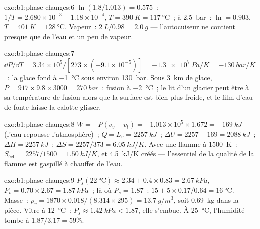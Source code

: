 \begin{solution}{exo:b1:phase-changes:6}
$\ln(1.8/1.013) = 0.575$~: $1/T = 2.680 \times 10^{-3} - 1.18 \times 10^{-4}$,
$T = \qty{390}{K} = \qty{117}{\degreeCelsius}$~; à \qty{2.5}{bar}~: $\ln = 0.903$,
$T = \qty{401}{K} = \qty{128}{\degreeCelsius}$. Vapeur~: $\qty{2}{L}/0.98 =
\qty{2.0}{g}$ --- l'autocuiseur ne contient presque que de l'eau et un peu de
vapeur.
\end{solution}

\begin{solution}{exo:b1:phase-changes:7}
$\dd P/\dd T = 3.34 \times 10^5/[273 \times (-9.1 \times 10^{-5})] = \qty{-1.3e7}{Pa/K}
= \qty{-130}{bar/K}$~: la glace fond à \qty{-1}{\degreeCelsius} sous environ
\qty{130}{bar}. Sous \qty{3}{km} de glace, $P = 917 \times 9.8 \times 3000 =
\qty{270}{bar}$~: fusion à \qty{-2}{\degreeCelsius}~; le lit d'un glacier peut
être à sa température de fusion alors que la surface est bien plus froide, et
le film d'eau de fonte laisse la calotte glisser.
\end{solution}

\begin{solution}{exo:b1:phase-changes:8}
$W = -P(v_v - v_l) = -1.013 \times 10^5 \times 1.672 = \qty{-169}{kJ}$ (l'eau
repousse l'atmosphère)~; $Q = L_v = \qty{2257}{kJ}$~; $\Delta U = 2257 - 169
= \qty{2088}{kJ}$~; $\Delta H = \qty{2257}{kJ}$~; $\Delta S = 2257/373 = \qty{6.05}{kJ/K}$.
Avec une flamme à \qty{1500}{K}~: $S_{\text{éch}} = 2257/1500 = \qty{1.50}{kJ/K}$,
et \qty{4.5}{kJ/K} créés --- l'essentiel de la qualité de la flamme est gaspillé
à chauffer de l'eau.
\end{solution}

\begin{solution}{exo:b1:phase-changes:9}
$P_s(\qty{22}{\degreeCelsius}) \approx 2.34 + 0.4 \times 0.83 = \qty{2.67}{kPa}$,
$P_v = 0.70 \times 2.67 = \qty{1.87}{kPa}$~;  là où $P_s = 1.87$~: $15 +
5 \times 0.17/0.64 = \qty{16}{\degreeCelsius}$. Masse~: $\rho_v = 1870 \times 0.018/
(8.314 \times 295) = \qty{13.7}{g/m^3}$, soit \qty{0.69}{kg} dans la pièce. Vitre à
\qty{12}{\degreeCelsius}~: $P_s \approx \qty{1.42}{kPa} < 1.87$, elle s'embue. À
\qty{25}{\degreeCelsius}, l'humidité tombe à $1.87/3.17 = 59\%$.
\end{solution}

